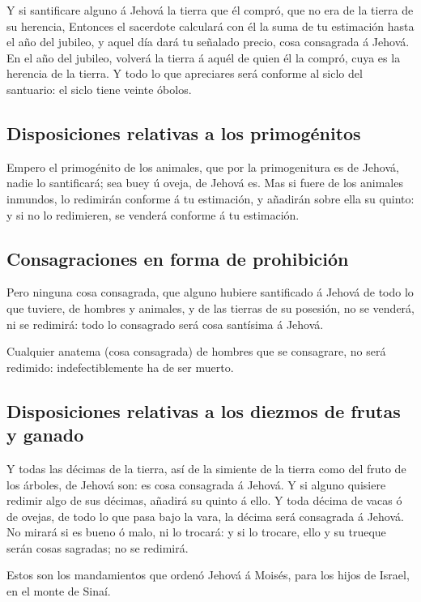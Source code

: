  Y si santificare alguno á Jehová la tierra que él compró,
que no era de la tierra de su herencia,  Entonces el
sacerdote calculará con él la suma de tu estimación hasta el año del
jubileo, y aquel día dará tu señalado precio, cosa consagrada á Jehová.
 En el año del jubileo, volverá la tierra á aquél de quien
él la compró, cuya es la herencia de la tierra.  Y todo lo
que apreciares será conforme al siclo del santuario: el siclo tiene
veinte óbolos.

\hypertarget{disposiciones-relativas-a-los-primoguxe9nitos}{%
\subsection{Disposiciones relativas a los
primogénitos}\label{disposiciones-relativas-a-los-primoguxe9nitos}}

 Empero el primogénito de los animales, que por la
primogenitura es de Jehová, nadie lo santificará; sea buey ú oveja, de
Jehová es.  Mas si fuere de los animales inmundos, lo
redimirán conforme á tu estimación, y añadirán sobre ella su quinto: y
si no lo redimieren, se venderá conforme á tu estimación.

\hypertarget{consagraciones-en-forma-de-prohibiciuxf3n}{%
\subsection{Consagraciones en forma de
prohibición}\label{consagraciones-en-forma-de-prohibiciuxf3n}}

 Pero ninguna cosa consagrada, que alguno hubiere
santificado á Jehová de todo lo que tuviere, de hombres y animales, y de
las tierras de su posesión, no se venderá, ni se redimirá: todo lo
consagrado será cosa santísima á Jehová.

 Cualquier anatema (cosa consagrada) de hombres que se
consagrare, no será redimido: indefectiblemente ha de ser muerto.

\hypertarget{disposiciones-relativas-a-los-diezmos-de-frutas-y-ganado}{%
\subsection{Disposiciones relativas a los diezmos de frutas y
ganado}\label{disposiciones-relativas-a-los-diezmos-de-frutas-y-ganado}}

 Y todas las décimas de la tierra, así de la simiente de la
tierra como del fruto de los árboles, de Jehová son: es cosa consagrada
á Jehová.  Y si alguno quisiere redimir algo de sus
décimas, añadirá su quinto á ello.  Y toda décima de vacas
ó de ovejas, de todo lo que pasa bajo la vara, la décima será consagrada
á Jehová.  No mirará si es bueno ó malo, ni lo trocará: y
si lo trocare, ello y su trueque serán cosas sagradas; no se redimirá.

 Estos son los mandamientos que ordenó Jehová á Moisés,
para los hijos de Israel, en el monte de Sinaí.
